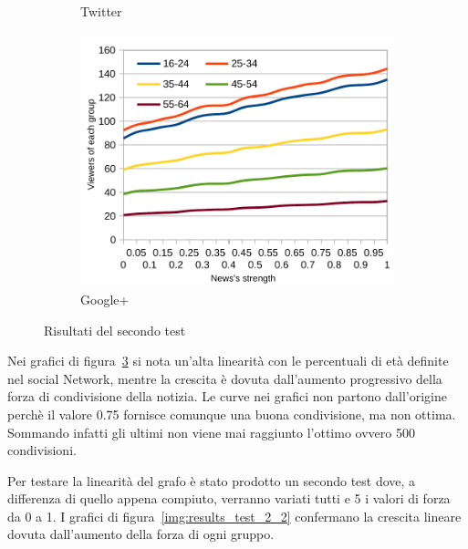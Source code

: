 \begin{figure}[!ht]
\begin{subfigure}[c]{0.32\textwidth}
\begin{center}
    \end{center}
    \vspace*{-10pt}
    \caption{Twitter}
    \label{img:result_test_2_tw_1}
  \end{subfigure}  
  \begin{subfigure}[r]{0.32\textwidth}
    \begin{center}
      \includegraphics[width=1\textwidth]{charts/second-test-gp_1.pdf}
    \end{center}
    \vspace*{-10pt}
    \caption{Google+}
    \label{img:result_test_2_gp_1}
  \end{subfigure}  
 \caption{Risultati del secondo test}
 \label{img:results_test_2_1}
\end{figure}
\vspace*{-15pt}

Nei grafici di figura~\ref{img:results_test_2_1} si nota un'alta linearità con le percentuali di età definite nel social Network, 
mentre la crescita è dovuta dall'aumento progressivo della forza di condivisione della notizia.
Le curve nei grafici non partono dall'origine perchè il valore 0.75 fornisce comunque una buona condivisione, ma non ottima. 
Sommando infatti gli ultimi non viene mai raggiunto l'ottimo ovvero 500 condivisioni.

Per testare la linearità del grafo è stato prodotto un secondo test dove, a differenza di quello appena compiuto,
verranno variati tutti e 5 i valori di forza da 0 a 1.
I grafici di figura~\ref{img:results_test_2_2} confermano la crescita lineare dovuta dall'aumento della forza di ogni gruppo.


